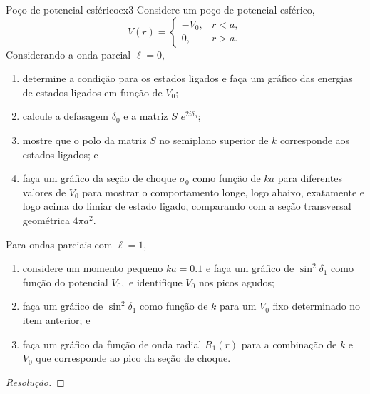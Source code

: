 \begin{exercício}{Poço de potencial esférico}{ex3}
   Considere um poço de potencial esférico,
   \begin{equation*}
       V(r) = \begin{cases}
          -V_0,&r < a,\\
          0, & r > a.
       \end{cases}
   \end{equation*}
   Considerando a onda parcial \(\ell = 0,\)
   \begin{enumerate}[label=(\alph*)]
       \item determine a condição para os estados ligados e faça um gráfico das energias de estados ligados em função de \(V_0\);
       \item calcule a defasagem \(\delta_0\) e a matriz \(S\) \(e^{2i \delta_0}\);
       \item mostre que o polo da matriz \(S\) no semiplano superior de \(k\) corresponde aos estados ligados; e
       \item faça um gráfico da seção de choque \(\sigma_0\) como função de \(ka\) para diferentes valores de \(V_0\) para mostrar o comportamento longe, logo abaixo, exatamente e logo acima do limiar de estado ligado, comparando com a seção transversal geométrica \(4\pi a^2.\)
   \end{enumerate}
   Para ondas parciais com \(\ell = 1,\)
   \begin{enumerate}[label=(\alph*)]
       \item considere um momento pequeno \(ka = 0.1\) e faça um gráfico de \(\sin^2\delta_1\) como função do potencial \(V_0,\) e identifique \(V_0\) nos picos agudos;
       \item faça um gráfico de \(\sin^2\delta_1\) como função de \(k\) para um \(V_0\) fixo determinado no item anterior; e
       \item faça um gráfico da função de onda radial \(R_1(r)\) para a combinação de \(k\) e \(V_0\) que corresponde ao pico da seção de choque.
   \end{enumerate}
\end{exercício}
\begin{proof}[Resolução]
    
\end{proof}
